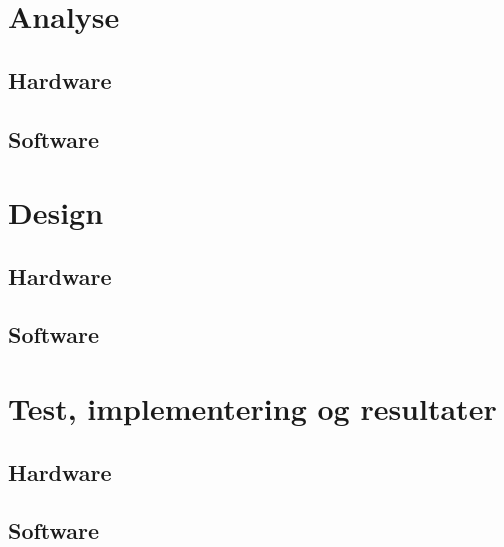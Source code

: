 \documentclass[a4paper, 11pt, oneside]{AuProjectHandin}
\begin{document}

\frontmatter
\tableofcontents
\mainmatter






\chapter{Analyse}
\section{Hardware}

\section{Software}




\chapter{Design}
\section{Hardware}
\section{Software}



\chapter{Test, implementering og resultater}
\section{Hardware}

\section{Software}






\backmatter

\end{document}
